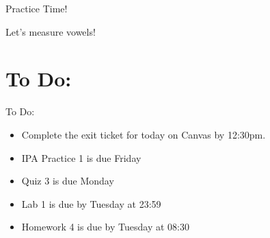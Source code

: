 \documentclass[professionalfonts]{beamer}
\begin{document}
\begin{frame}{Practice Time!}
    \begin{center}
        \Huge Let's measure vowels!
    \end{center}
\end{frame}

\section*{To Do:}
\begin{frame}{To Do:}
    \begin{itemize}
        \item Complete the exit ticket for today on Canvas by 12:30pm.
        \item IPA Practice 1 is due Friday
        \item Quiz 3 is due Monday
        \item Lab 1 is due by Tuesday at 23:59
        \item Homework 4 is due by Tuesday at 08:30
    \end{itemize}
\end{frame}

\end{document}
